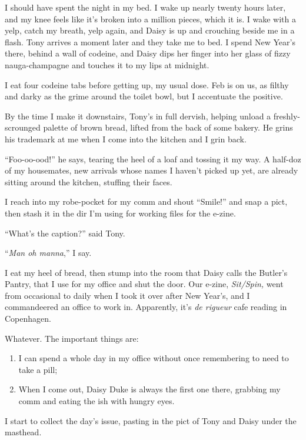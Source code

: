 \tb

I should have spent the night in my bed. I wake up nearly twenty
hours later, and my knee feels like it's broken into a million
pieces, which it is. I wake with a yelp, catch my breath, yelp
again, and Daisy is up and crouching beside me in a flash. Tony
arrives a moment later and they take me to bed. I spend New Year's
there, behind a wall of codeine, and Daisy dips her finger into her
glass of fizzy nauga-champagne and touches it to my lips at
midnight.

\tb

I eat four codeine tabs before getting up, my usual dose. Feb is on
us, as filthy and darky as the grime around the toilet bowl, but I
accentuate the positive.

By the time I make it downstairs, Tony's in full dervish, helping
unload a freshly-scrounged palette of brown bread, lifted from the
back of some bakery. He grins his trademark at me when I come into
the kitchen and I grin back.

``Foo-oo-ood!'' he says, tearing the heel of a loaf and tossing it
my way. A half-doz of my housemates, new arrivals whose names I
haven't picked up yet, are already sitting around the kitchen,
stuffing their faces.

I reach into my robe-pocket for my comm and shout ``Smile!'' and
snap a pict, then stash it in the dir I'm using for working files
for the e-zine.

``What's the caption?'' said Tony.

``\emph{Man oh manna},'' I say.

I eat my heel of bread, then stump into the room that Daisy calls
the Butler's Pantry, that I use for my office and shut the door.
Our e-zine, \emph{Sit/Spin,} went from occasional to daily when I
took it over after New Year's, and I commandeered an office to work
in. Apparently, it's \emph{de rigueur} cafe reading in Copenhagen.

Whatever. The important things are:

\begin{enumerate}[1)]
\item
  I can spend a whole day in my office without once remembering to
  need to take a pill;

\item
  When I come out, Daisy Duke is always the first one there, grabbing
  my comm and eating the ish with hungry eyes.

\end{enumerate}
I start to collect the day's issue, pasting in the pict of Tony and
Daisy under the masthead.

